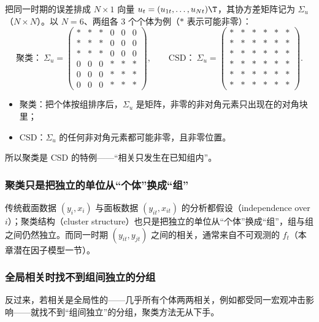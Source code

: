 把同一时期的误差排成 $N\times1$ 向量 $u_t=(u_{1t},\dots,u_{Nt})\T$，其协方差矩阵记为 $\Sigma_u$（$N\times N$）。以 $N=6$、两组各 3 个个体为例（$\ast$ 表示可能非零）：
\[
\text{聚类：}\ \Sigma_u=\begin{pmatrix}
\ast&\ast&\ast&0&0&0\\
\ast&\ast&\ast&0&0&0\\
\ast&\ast&\ast&0&0&0\\
0&0&0&\ast&\ast&\ast\\
0&0&0&\ast&\ast&\ast\\
0&0&0&\ast&\ast&\ast
\end{pmatrix},\qquad
\text{CSD：}\ \Sigma_u=\begin{pmatrix}
\ast&\ast&\ast&\ast&\ast&\ast\\
\ast&\ast&\ast&\ast&\ast&\ast\\
\ast&\ast&\ast&\ast&\ast&\ast\\
\ast&\ast&\ast&\ast&\ast&\ast\\
\ast&\ast&\ast&\ast&\ast&\ast\\
\ast&\ast&\ast&\ast&\ast&\ast
\end{pmatrix}.
\]
\begin{itemize}
\item 聚类：把个体按组排序后，$\Sigma_u$ 是矩阵，非零的非对角元素只出现在的对角块里；
\item CSD：$\Sigma_u$ 的任何非对角元素都可能非零，且非零位置。
\end{itemize}
所以聚类是 CSD 的特例——“相关只发生在已知组内”。

\subsubsection{聚类只是把独立的单位从“个体”换成“组”}

传统截面数据 $(y_i,x_i)$ 与面板数据 $(y_{it},x_{it})$ 的分析都假设（independence over $i$）；聚类结构（cluster structure）也只是把独立的单位从“个体”换成“组”，组与组之间仍然独立。而同一时期 $(y_{it},y_{jt})$ 之间的相关，通常来自不可观测的 $f_t$（本章潜在因子模型一节）。

\subsubsection{全局相关时找不到组间独立的分组}

反过来，若相关是全局性的——几乎所有个体两两相关，例如都受同一宏观冲击影响——就找不到“组间独立”的分组，聚类方法无从下手。

